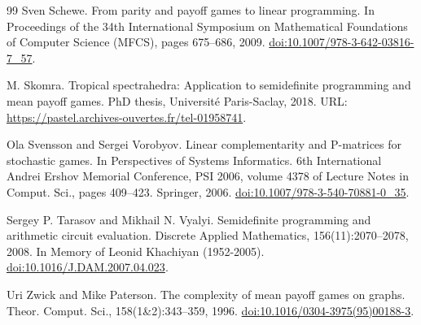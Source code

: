 \documentclass[10pt,a4paper]{article}
\theoremstyle{definition}
\begin{document}
\begin{thebibliography}{99}
 Sven Schewe. From parity and payoff games to linear programming. In Proceedings of the 34th International Symposium on Mathematical Foundations of Computer Science (MFCS), pages 675–686, 2009. \href{https://doi.org/10.1007/978-3-642-03816-7_57}{doi:10.1007/978-3-642-03816-7\_57}.

 M. Skomra. Tropical spectrahedra: Application to semidefinite programming and mean payoff games. PhD thesis, Université Paris-Saclay, 2018. URL: \href{https://pastel.archives-ouvertes.fr/tel-01958741}{https://pastel.archives-ouvertes.fr/tel-01958741}.

 Ola Svensson and Sergei Vorobyov. Linear complementarity and P-matrices for stochastic games. In Perspectives of Systems Informatics. 6th International Andrei Ershov Memorial Conference, PSI 2006, volume 4378 of Lecture Notes in Comput. Sci., pages 409–423. Springer, 2006. \href{https://doi.org/10.1007/978-3-540-70881-0_35}{doi:10.1007/978-3-540-70881-0\_35}.

 Sergey P. Tarasov and Mikhail N. Vyalyi. Semidefinite programming and arithmetic circuit evaluation. Discrete Applied Mathematics, 156(11):2070–2078, 2008. In Memory of Leonid Khachiyan (1952-2005). \href{https://doi.org/10.1016/J.DAM.2007.04.023}{doi:10.1016/J.DAM.2007.04.023}.

 Uri Zwick and Mike Paterson. The complexity of mean payoff games on graphs. Theor. Comput. Sci., 158(1\&2):343–359, 1996. \href{https://doi.org/10.1016/0304-3975(95)00188-3}{doi:10.1016/0304-3975(95)00188-3}.

\end{thebibliography}
\end{document}
